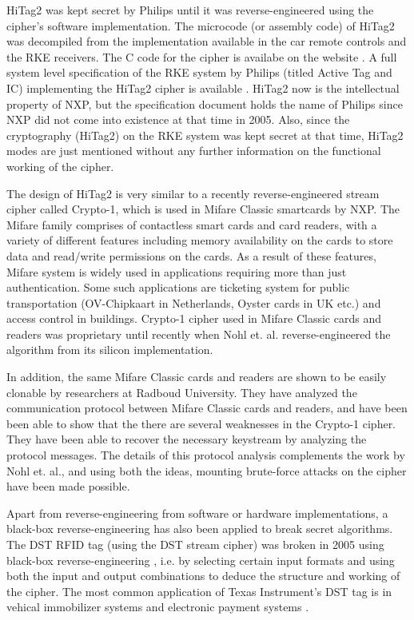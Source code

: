 HiTag2 was kept secret by Philips until it was reverse-engineered using the cipher's software implementation. The microcode (or assembly code) of HiTag2 was decompiled from the implementation available in the car remote controls and the RKE receivers. The C code for the cipher is availabe on the website \cite{hitag2-code}. A full system level specification of the RKE system by Philips (titled Active Tag and IC) implementing the HiTag2 cipher is available \cite{active-tag-datasheet}. HiTag2 now is the intellectual property of NXP, but the specification document holds the name of Philips since NXP did not come into existence at that time in 2005. Also, since the cryptography (HiTag2) on the RKE system was kept secret at that time, HiTag2 modes are just mentioned without any further information on the functional working of the cipher.

The design of HiTag2 is very similar to a recently reverse-engineered \cite{NohlESP-2008-usenix} stream cipher called Crypto-1, which is used in Mifare Classic smartcards by NXP. The Mifare family comprises of contactless smart cards and card readers, with a variety of different features including memory availability on the cards to store data and read/write permissions on the cards. As a result of these features, Mifare system is widely used in applications requiring more than just authentication. Some such applications are ticketing system for public transportation (OV-Chipkaart in Netherlands, Oyster cards in UK etc.) and access control in buildings. Crypto-1 cipher used in Mifare Classic cards and readers was proprietary until recently when Nohl et. al. \cite{NohlESP-2008-usenix} reverse-engineered the algorithm from its silicon implementation.

In addition, the same Mifare Classic cards and readers are shown to be easily clonable \cite{dekoninggans2008pam} by researchers at Radboud University. They have analyzed the communication protocol between Mifare Classic cards and readers, and have been been able to show that the there are several weaknesses in the Crypto-1 cipher. They have been able to recover the necessary keystream by analyzing the protocol messages. The details of this protocol analysis complements the work by Nohl et. al., and using both the ideas, mounting brute-force attacks on the cipher have been made possible. 

Apart from reverse-engineering from software or hardware implementations, a black-box reverse-engineering has also been applied to break secret algorithms. The DST RFID tag (using the DST stream cipher) was broken in 2005 using black-box reverse-engineering \cite{bono2005sac}, i.e. by selecting certain input formats and using both the input and output combinations to deduce the structure and working of the cipher. The most common application of Texas Instrument's DST tag is in vehical immobilizer systems and electronic payment systems \cite{dst-rfid-analysis}. 

